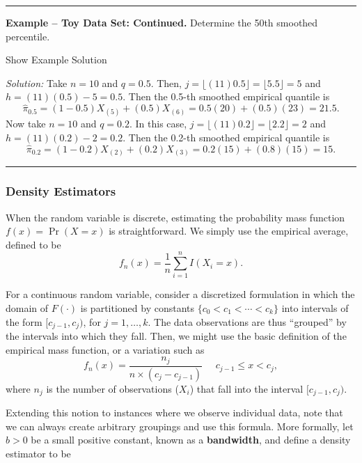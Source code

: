 \documentclass[]{book}
\theoremstyle{definition}
\theoremstyle{definition}
\theoremstyle{definition}
\theoremstyle{remark}
\begin{document}
\begin{center}\rule{0.5\linewidth}{\linethickness}\end{center}

\textbf{Example -- Toy Data Set: Continued.} Determine the 50th smoothed
percentile.

Show Example Solution

\hypertarget{toggleExampleToyp}{}
\emph{Solution:} Take \(n=10\) and \(q=0.5\). Then,
\(j=\lfloor(11)0.5 \rfloor= \lfloor5.5 \rfloor=5\) and
\(h=(11)(0.5)-5=0.5\). Then the 0.5-th smoothed empirical quantile is
\[\hat{\pi}_{0.5} = (1-0.5) X_{(5)} + (0.5) X_{(6)} = 0.5 (20) + (0.5)(23) = 21.5.\]
Now take \(n=10\) and \(q=0.2\). In this case,
\(j=\lfloor(11)0.2\rfloor=\lfloor 2.2 \rfloor=2\) and
\(h=(11)(0.2)-2=0.2\). Then the 0.2-th smoothed empirical quantile is
\[\hat{\pi}_{0.2} = (1-0.2) X_{(2)} + (0.2) X_{(3)} = 0.2 (15) + (0.8)(15) = 15.\]

\begin{center}\rule{0.5\linewidth}{\linethickness}\end{center}

\subsubsection{Density Estimators}\label{density-estimators}

When the random variable is discrete, estimating the probability mass
function \(f(x) = \Pr(X=x)\) is straightforward. We simply use the
empirical average, defined to be
\[f_n(x) = \frac{1}{n} \sum_{i=1}^n I(X_i = x).\]

For a continuous random variable, consider a discretized formulation in
which the domain of \(F(\cdot)\) is partitioned by constants
\(\{c_0 < c_1 < \cdots < c_k\}\) into intervals of the form
\([c_{j-1}, c_j)\), for \(j=1, \ldots, k\). The data observations are
thus ``grouped'' by the intervals into which they fall. Then, we might
use the basic definition of the empirical mass function, or a variation
such as
\[f_n(x) = \frac{n_j}{n \times (c_j - c_{j-1})}  \ \ \ \ \ \ c_{j-1} \le x < c_j,\]
where \(n_j\) is the number of observations (\(X_i\)) that fall into the
interval \([c_{j-1}, c_j)\).

Extending this notion to instances where we observe individual data,
note that we can always create arbitrary groupings and use this formula.
More formally, let \(b>0\) be a small positive constant, known as a
\textbf{bandwidth}, and define a density estimator to be
\end{document}
